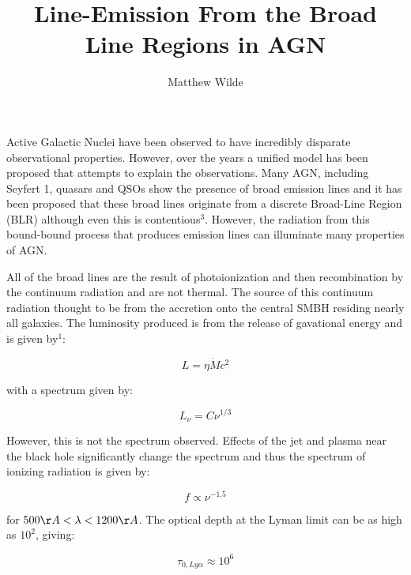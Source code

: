 \documentclass[12pt]{article}   	%
\title{Line-Emission From the Broad Line Regions in AGN}
\author{Matthew Wilde}
\begin{document}
\maketitle


	Active Galactic Nuclei have been observed to have incredibly disparate observational properties. However, over the years a unified model has been proposed that attempts to explain the observations. Many AGN, including Seyfert 1, quasars and QSOs show the presence of broad emission lines and it has been proposed that these broad lines originate from a discrete Broad-Line Region (BLR) although even this is contentious$^{3}$. However, the radiation from this bound-bound process that produces emission lines can illuminate many properties of AGN. 
	
	All of the broad lines are the result of photoionization and then recombination by the continuum radiation and are not thermal. The source of this continuum radiation thought to be from the accretion onto the central SMBH residing nearly all galaxies. The luminosity produced is from the release of gavational energy and is given by$^{1}$:
	
\begin{equation}
L = \eta \dot{M} c^{2}
\end{equation}

with a spectrum given by:

\begin{equation}
L_{\nu} = C \nu^{1/3}
\end{equation}

However, this is not the spectrum observed. Effects of the jet and plasma near the black hole significantly change the spectrum and thus the spectrum of ionizing radiation is given by:

\begin{equation}
f \propto \nu^{-1.5}
\end{equation}

for $500 \AA < \lambda < 1200 \AA$. The optical depth at the Lyman limit can be as high as $10^{2}$, giving:


\begin{equation}
\tau_{0,Ly \alpha} \approx 10^{6}
\end{equation}
\end{document}
